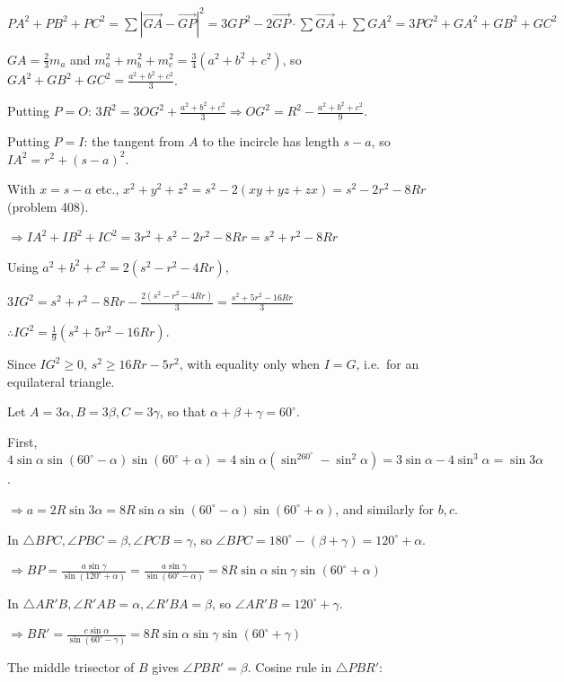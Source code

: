   $PA^2 + PB^2 + PC^2 = \sum|\vec{GA} - \vec{GP}|^2 = 3GP^2 - 2\vec{GP}\cdot\sum\vec{GA} + \sum GA^2 = 3PG^2 +
  GA^2 + GB^2 + GC^2$

  $GA = \frac{2}{3}m_a$ and $m_a^2 + m_b^2 + m_c^2 = \frac{3}{4}(a^2 + b^2 + c^2)$, so $GA^2 + GB^2 + GC^2 =
  \frac{a^2 + b^2 + c^2}{3}$.

  Putting $P = O$: $3R^2 = 3OG^2 + \frac{a^2 + b^2 + c^2}{3}\Rightarrow OG^2 = R^2 - \frac{a^2 + b^2 +
  c^2}{9}$.

  Putting $P = I$: the tangent from $A$ to the incircle has length $s - a$, so $IA^2 = r^2 + (s - a)^2$.

  With $x = s - a$ etc., $x^2 + y^2 + z^2 = s^2 - 2(xy + yz + zx) = s^2 - 2r^2 - 8Rr$ (problem 408).

  $\Rightarrow IA^2 + IB^2 + IC^2 = 3r^2 + s^2 - 2r^2 - 8Rr = s^2 + r^2 - 8Rr$

  Using $a^2 + b^2 + c^2 = 2(s^2 - r^2 - 4Rr)$,

  $3IG^2 = s^2 + r^2 - 8Rr - \frac{2(s^2 - r^2 - 4Rr)}{3} = \frac{s^2 + 5r^2 - 16Rr}{3}$

  $\therefore IG^2 = \frac{1}{9}\left(s^2 + 5r^2 - 16Rr\right)$.

  Since $IG^2\geq 0$, $s^2\geq 16Rr - 5r^2$, with equality only when $I = G$, i.e.\ for an equilateral
  triangle.
\item Let $A = 3\alpha, B = 3\beta, C = 3\gamma$, so that $\alpha + \beta + \gamma = 60^\circ$.

  First, $4\sin\alpha\sin(60^\circ - \alpha)\sin(60^\circ + \alpha) = 4\sin\alpha(\sin^260^\circ -
  \sin^2\alpha) = 3\sin\alpha - 4\sin^3\alpha = \sin3\alpha$.

  $\Rightarrow a = 2R\sin3\alpha = 8R\sin\alpha\sin(60^\circ - \alpha)\sin(60^\circ + \alpha)$, and similarly
  for $b, c$.

  In $\triangle BPC, \angle PBC = \beta, \angle PCB = \gamma$, so $\angle BPC = 180^\circ - (\beta + \gamma) =
  120^\circ + \alpha$.

  $\Rightarrow BP = \frac{a\sin\gamma}{\sin(120^\circ + \alpha)} = \frac{a\sin\gamma}{\sin(60^\circ -
  \alpha)} = 8R\sin\alpha\sin\gamma\sin(60^\circ + \alpha)$

  In $\triangle AR'B, \angle R'AB = \alpha, \angle R'BA = \beta$, so $\angle AR'B = 120^\circ + \gamma$.

  $\Rightarrow BR' = \frac{c\sin\alpha}{\sin(60^\circ - \gamma)} = 8R\sin\alpha\sin\gamma\sin(60^\circ +
  \gamma)$

  The middle trisector of $B$ gives $\angle PBR' = \beta$. Cosine rule in $\triangle PBR'$:

